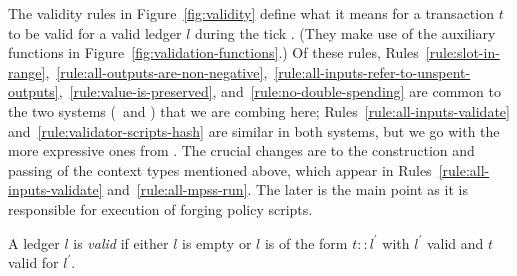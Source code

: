 The validity rules in Figure~\ref{fig:validity} define what it means for a transaction $t$ to be valid for a valid ledger $l$ during the tick \currentTick. (They make use of the auxiliary functions in Figure~\ref{fig:validation-functions}.) Of these rules, Rules~\ref{rule:slot-in-range},~\ref{rule:all-outputs-are-non-negative},~\ref{rule:all-inputs-refer-to-unspent-outputs},~\ref{rule:value-is-preserved}, and~\ref{rule:no-double-spending} are common to the two systems (\EUTXO\ and \UTXOma) that we are combing here; Rules~\ref{rule:all-inputs-validate} and~\ref{rule:validator-scripts-hash} are similar in both systems, but we go with the more expressive ones from \EUTXO. The crucial changes are to the construction and passing of the context types mentioned above, which appear in Rules~\ref{rule:all-inputs-validate} and~\ref{rule:all-mpss-run}. The later is the main point as it is responsible for execution of forging policy scripts.

A ledger $l$ is \textit{valid} if either $l$ is empty or $l$ is of the form $t::l^{\prime}$ with $l^{\prime}$ valid and $t$ valid for $l^{\prime}$.
